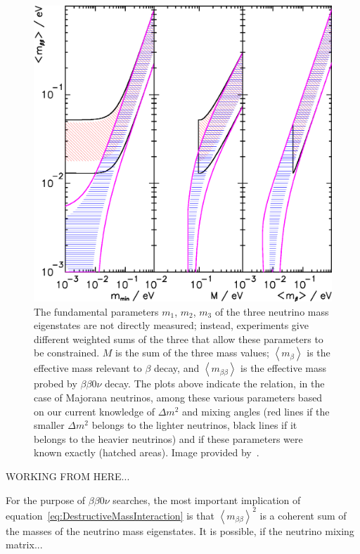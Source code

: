 \begin{figure}
\includegraphics[scale=0.45]{PDGNeutrinoMassBounds.eps}
\caption{The fundamental parameters $m_1$, $m_2$, $m_3$ of the three neutrino mass eigenstates are not directly measured; instead, experiments give different weighted sums of the three that allow these parameters to be constrained.  $M$ is the sum of the three mass values; $\left<m_\beta\right>$ is the effective mass relevant to $\beta$ decay, and $\left<m_{\beta\beta}\right>$ is the effective mass probed by $\beta\beta 0\nu$ decay.  The plots above indicate the relation, in the case of Majorana neutrinos, among these various parameters based on our current knowledge of $\Delta m^2$ and mixing angles (red lines if the smaller $\Delta m^2$ belongs to the lighter neutrinos, black lines if it belongs to the heavier neutrinos) and if these parameters were known exactly (hatched areas).  Image provided by~\cite{PDG}.}
\label{fig:NeutrinoMassBounds}
\end{figure}

WORKING FROM HERE...

For the purpose of $\beta\beta 0\nu$ searches, the most important implication of equation~\ref{eq:DestructiveMassInteraction} is that $\left< m_{\beta\beta}\right>^2$ is a coherent sum of the masses of the neutrino mass eigenstates.  It is possible, if the neutrino mixing matrix...

